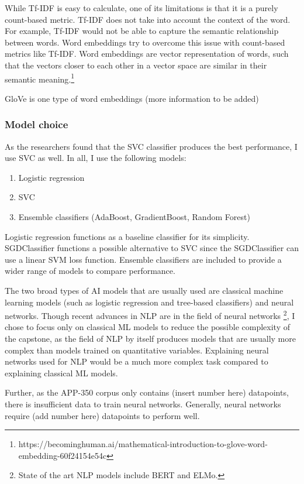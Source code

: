 While Tf-IDF is easy to calculate, one of its limitations is that it is a purely count-based metric. Tf-IDF does not take into account the context of the word. For example, Tf-IDF would not be able to capture the semantic relationship between words. Word embeddings try to overcome this issue with count-based metrics like Tf-IDF. Word embeddings are vector representation of words, such that the vectors closer to each other in a vector space are similar in their semantic meaning.\footnote{https://becominghuman.ai/mathematical-introduction-to-glove-word-embedding-60f24154e54c}

GloVe is one type of word embeddings (more information to be added)


\subsubsection{Model choice}
As the researchers found that the SVC classifier produces the best performance, I use SVC as well. In all, I use the following models:
\begin{enumerate}
	\item Logistic regression
	\item SVC
	\item Ensemble classifiers (AdaBoost, GradientBoost, Random Forest)
\end{enumerate}

Logistic regression functions as a baseline classifier for its simplicity. SGDClassifier functions a possible alternative to SVC since the SGDClassifier can use a linear SVM loss function. Ensemble classifiers are included to provide a wider range of models to compare performance.

The two broad types of AI models that are usually used are classical machine learning models (such as logistic regression and tree-based classifiers) and neural networks. Though recent advances in NLP are in the field of neural networks \footnote{State of the art NLP models include BERT and ELMo.}, I chose to focus only on classical ML models to reduce the possible complexity of the capstone, as the field of NLP by itself produces models that are usually more complex than models trained on quantitative variables. Explaining neural networks used for NLP would be a much more complex task compared to explaining classical ML models.

Further, as the APP-350 corpus only contains (insert number here) datapoints, there is insufficient data to train neural networks. Generally, neural networks require (add number here) datapoints to perform well.

